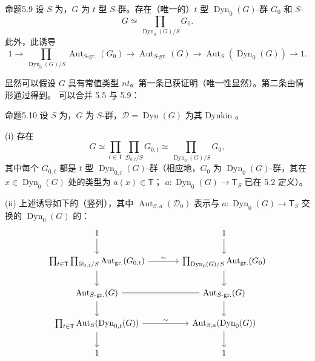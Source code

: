\begin{SGAresult}{命题}{5.9}
设 $S$ 为，$G$ 为 $t$ 型 $S$-群。存在（唯一的）$t$ 型 $\operatorname{Dyn}_0(G)$-群 $G_0$ 和 $S$-
\[G\simeq\prod_{\operatorname{Dyn}_0(G)/S}G_0.\]
此外，此诱导
\[1\longrightarrow\prod_{\operatorname{Dyn}_0(G)/S}\operatorname{Aut}_{S\text{-gr.}}(G_0)\longrightarrow\operatorname{Aut}_{S\text{-gr.}}(G)\longrightarrow\operatorname{Aut}_S(\operatorname{Dyn}_0(G))\longrightarrow1.\]
\end{SGAresult}
显然可以假设 $G$ 具有常值类型 $nt$。第一条已获证明（唯一性显然）。第二条由情形通过得到。
可以合并 5.5 与 5.9：
\begin{SGAresult}{命题}{5.10}
设 $S$ 为，$G$ 为 $S$-群，$\mathscr D=\operatorname{Dyn}(G)$ 为其 Dynkin 。

(i) 存在
\[G\simeq\prod_{t\in\mathsf T}\prod_{\mathscr D_{0,t}/S}G_{0,t}\simeq\prod_{\operatorname{Dyn}_0(G)/S}G_0,\]
其中每个 $G_{0,t}$ 都是 $t$ 型 $\operatorname{Dyn}_{0,t}(G)$-群（相应地，$G_0$ 为 $\operatorname{Dyn}_0(G)$-群，其在 $x\in\operatorname{Dyn}_0(G)$ 处的类型为 $a(x)\in\mathsf T$； $a:\operatorname{Dyn}_0(G)\to\mathsf T_S$ 已在 5.2 定义）。

(ii) 上述诱导如下的（竖列），其中 $\operatorname{Aut}_{S,a}(\mathscr D_0)$ 表示与 $a:\operatorname{Dyn}_0(G)\to\mathsf T_S$ 交换的 $\operatorname{Dyn}_0(G)$ 的：
\[
\begin{tikzcd}[column sep=large]
1\arrow[d]&1\arrow[d]\\
\prod_{t\in\mathsf T}\prod_{\mathscr D_{0,t}/S}\operatorname{Aut}_{\mathrm{gr.}}(G_{0,t})\arrow[d]\arrow[r,"\sim"]&\prod_{\operatorname{Dyn}_0(G)/S}\operatorname{Aut}_{\mathrm{gr.}}(G_0)\arrow[d]\\
\operatorname{Aut}_{S\text{-gr.}}(G)\arrow[d]\arrow[r,equal]&\operatorname{Aut}_{S\text{-gr.}}(G)\arrow[d]\\
\prod_{t\in\mathsf T}\operatorname{Aut}_S(\operatorname{Dyn}_{0,t}(G))\arrow[r,"\sim"]\arrow[d]&\operatorname{Aut}_{S,a}(\operatorname{Dyn}_0(G))\arrow[d]\\
1&1
\end{tikzcd}
\]
\end{SGAresult}
